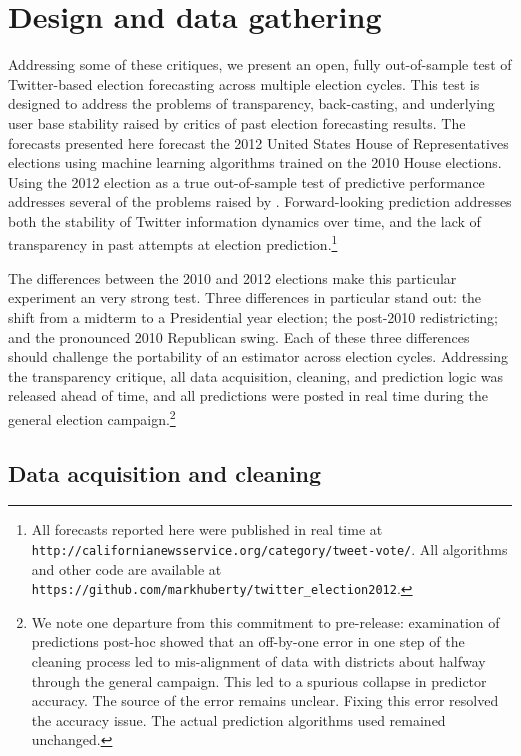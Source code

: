 \documentclass{acm_proc_article-sp}
\begin{document}
\section{Design and data gathering}
\label{sec:design-data-gath}

Addressing some of these critiques, we present an open, fully
out-of-sample test of Twitter-based election forecasting across
multiple election cycles. This test is designed to address the
problems of transparency, back-casting, and underlying user base
stability raised by critics of past election forecasting results. The
forecasts presented here forecast the 2012 United States House of
Representatives elections using machine learning algorithms trained on
the 2010 House elections. Using the 2012 election as a true
out-of-sample test of predictive performance addresses several of the
problems raised by \cite{gayo2011limits}. Forward-looking prediction
addresses both the stability of Twitter information dynamics over
time, and the lack of transparency in past attempts at election
prediction.\footnote{All forecasts reported here were published in
real time at \texttt{http://californianewsservice.org/category/tweet-vote/}.  All
algorithms and other code are available at \texttt{https://github.com/markhuberty/twitter\_election2012}.}

The differences between the 2010 and 2012 elections make this
particular experiment an very strong test. Three differences in
particular stand out: the shift from a midterm to a Presidential year
election; the post-2010 redistricting; and the pronounced 2010
Republican swing. Each of these three differences should challenge the
portability of an estimator across election cycles. Addressing the
transparency critique, all data acquisition, cleaning, and prediction
logic was released ahead of time, and all predictions were posted in
real time during the general election campaign.\footnote{We note one departure from this commitment to
  pre-release: examination of predictions post-hoc showed that an
  off-by-one error in one step of the cleaning process led to
  mis-alignment of data with districts about halfway through the general
  campaign. This led to a spurious collapse in predictor accuracy. The
  source of the error remains unclear. Fixing this error resolved the
  accuracy issue. The actual prediction algorithms used remained
  unchanged.}

\subsection{Data acquisition and cleaning}
\label{sec:data-acquisition}
\end{document}
